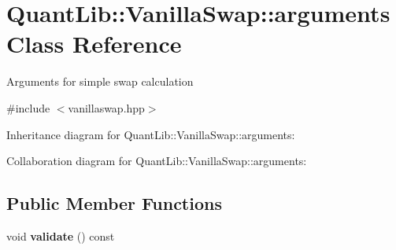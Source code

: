 \section{Quant\+Lib\+:\+:Vanilla\+Swap\+:\+:arguments Class Reference}
\label{class_quant_lib_1_1_vanilla_swap_1_1arguments}


Arguments for simple swap calculation  




{\ttfamily \#include $<$vanillaswap.\+hpp$>$}



Inheritance diagram for Quant\+Lib\+:\+:Vanilla\+Swap\+:\+:arguments\+:


Collaboration diagram for Quant\+Lib\+:\+:Vanilla\+Swap\+:\+:arguments\+:
\subsection*{Public Member Functions}
\begin{DoxyCompactItemize}
\item 
void {\bfseries validate} () const \label{class_quant_lib_1_1_vanilla_swap_1_1arguments_adf00890fe414f095d64ce58735f8d520}

\end{DoxyCompactItemize}
